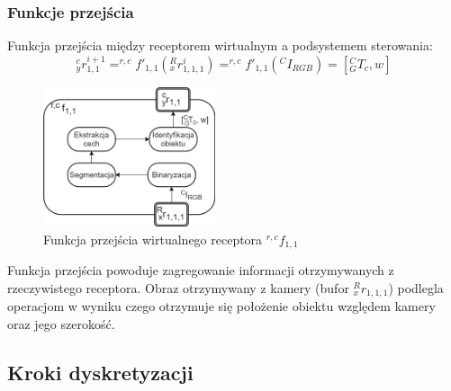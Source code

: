 \documentclass{article}
\begin{document}
\subsubsection{Funkcje przej\'scia}
Funkcja przej\'scia między receptorem wirtualnym a podsystemem sterowania:
\[ _y^cr^{i+1}_{1,1} = ^{r,c}f'_{1,1}(_x^Rr_{1,1,1}^i)=^{r,c}f'_{1,1}(^CI_{RGB})=[^C_GT_c,w]\]
\begin{figure}[H]
	\centering
	\includegraphics[width=0.45\textwidth]{WR_funkcje.png}
	\caption{Funkcja przej\'scia wirtualnego receptora $^{r,c}f_{1,1}$}
	\label{fig::WR_funkcje}
\end{figure}
Funkcja przej\'scia powoduje zagregowanie informacji otrzymywanych z rzeczywistego receptora. Obraz otrzymywany z kamery (bufor $_x^Rr_{1,1,1}$) podlegla operacjom w wyniku czego otrzymuje się położenie obiektu względem kamery oraz jego szeroko\'sć.


\subsection{Kroki dyskretyzacji}
\end{document}
